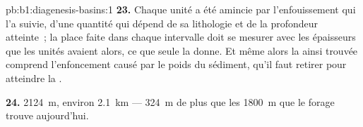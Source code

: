 \begin{solution}{pb:b1:diagenesis-basins:1}
\textbf{23.} Chaque unité a été amincie par l'enfouissement qui l'a suivie, d'une
quantité qui dépend de sa lithologie et de la profondeur atteinte~; la place faite dans
chaque intervalle doit se mesurer avec les épaisseurs que les unités avaient alors, ce que
seule la  donne. Et même alors la  ainsi trouvée comprend
l'enfoncement causé par le poids du sédiment, qu'il faut retirer pour atteindre la
.

\textbf{24.} \qty{2124}{m}, environ \qty{2.1}{km} --- \qty{324}{m} de plus que les
\qty{1800}{m} que le forage trouve aujourd'hui.
\end{solution}
